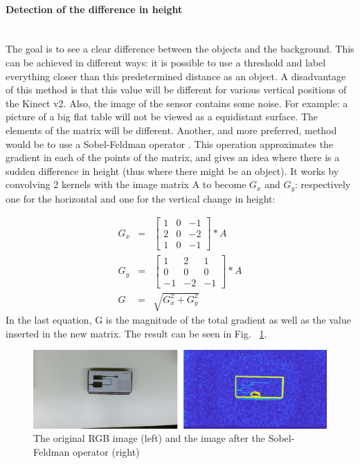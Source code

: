 \documentclass{article}
\begin{document}
\paragraph{Detection of the difference in height}\mbox{}\\
The goal is to see a clear difference between the objects and the background. This can be achieved in different ways: it is possible to use a threshold and label everything closer than this predetermined distance as an object. A disadvantage of this method is that this value will be different for various vertical positions of the Kinect v2. Also, the image of the sensor contains some noise. For example: a picture of a big flat table will not be viewed as a equidistant surface. The elements of the matrix will be different. Another, and more preferred, method would be to use a Sobel-Feldman operator \cite{Sobel_operator}. This operation approximates the gradient in each of the points of the matrix, and gives an idea where there is a sudden difference in height (thus where there might be an object). It works by convolving 2 kernels with the image matrix A to become $G_{x}$ and $G_{y}$: respectively one for the horizontal and one for the vertical change in height: 

\begin{eqnarray*}
G_{x} &=& 
	\begin{bmatrix}
		1&0&-1\\
		2&0&-2\\
		1&0&-1
	\end{bmatrix}
	*A \\
G_{y} &=& 
	\begin{bmatrix}
		1&2&1\\
		0&0&0\\
		-1&-2&-1
	\end{bmatrix}
	*A\\
G &=& \sqrt{G_{x}^2+G_{y}^2}
\end{eqnarray*}
In the last equation, G is the magnitude of the total gradient as well as the value inserted in the new matrix.
The result can be seen in Fig. ~\ref{fig:original_and_sobel}.
\begin{figure}[h]
	\center
  \includegraphics[width=1\linewidth]{original_and_sobel.png}
  \caption{The original RGB image (left) and the image after the Sobel-Feldman operator (right)}
  \label{fig:original_and_sobel}
\end{figure}
\end{document}

